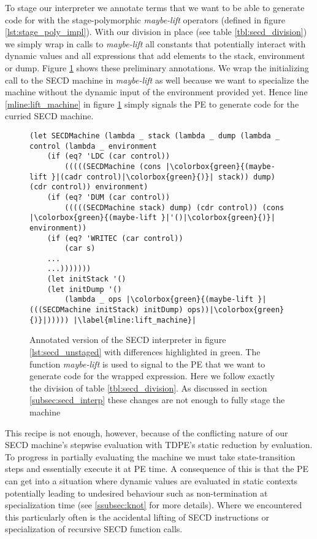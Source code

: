 \documentclass[a4paper,12pt,twoside,openright]{report}
\theoremstyle{definition}
\begin{document}
To stage our interpreter we annotate terms that we want to be able to generate code for with the stage-polymorphic \textit{maybe-lift} operators (defined in figure \ref{lst:stage_poly_impl}). With our division in place (see table \ref{tbl:secd_division}) we simply wrap in calls to \textit{maybe-lift} all constants that potentially interact with dynamic values and all expressions that add elements to the stack, environment or dump. Figure \ref{lst:secd_staged1} shows these preliminary annotations. We wrap the initializing call to the SECD machine in \textit{maybe-lift} as well because we want to specialize the machine without the dynamic input of the environment provided yet. Hence line \ref{mline:lift_machine} in figure \ref{lst:secd_staged1} simply signals the PE to generate code for the curried SECD machine.

\begin{figure}[ht]
\centering
\begin{verbatim}
(let SECDMachine (lambda _ stack (lambda _ dump (lambda _ control (lambda _ environment
    (if (eq? 'LDC (car control))
        (((((SECDMachine (cons |\colorbox{green}{(maybe-lift }|(cadr control)|\colorbox{green}{)}| stack)) dump) (cdr control)) environment)
    (if (eq? 'DUM (car control))
        (((((SECDMachine stack) dump) (cdr control)) (cons |\colorbox{green}{(maybe-lift }|'()|\colorbox{green}{)}| environment))
    (if (eq? 'WRITEC (car control))
        (car s)
    ...
    ...)))))))
    (let initStack '()
    (let initDump '()
        (lambda _ ops |\colorbox{green}{(maybe-lift }|(((SECDMachine initStack) initDump) ops))|\colorbox{green}{)}|))))) |\label{mline:lift_machine}|
\end{verbatim}
\caption{Annotated version of the SECD interpreter in figure \ref{lst:secd_unstaged} with differences highlighted in green. The function \textit{maybe-lift} is used to signal to the PE that we want to generate code for the wrapped expression. Here we follow exactly the division of table \ref{tbl:secd_division}. As discussed in section \ref{subsec:secd_interp} these changes are not enough to fully stage the machine}
\label{lst:secd_staged1}
\end{figure}

This recipe is not enough, however, because of the conflicting nature of our SECD machine's stepwise evaluation with TDPE's static reduction by evaluation. To progress in partially evaluating the machine we must take state-transition steps and essentially execute it at PE time. A consequence of this is that the PE can get into a situation where dynamic values are evaluated in static contexts potentially leading to undesired behaviour such as non-termination at specialization time (see \ref{ssubsec:knot} for more details). Where we encountered this particularly often is the accidental lifting of SECD instructions or specialization of recursive SECD function calls.
\end{document}
